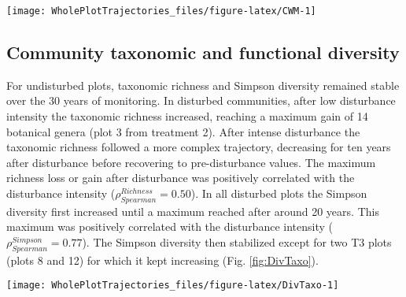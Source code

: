 \documentclass[fleqn,10pt]{ArtEcoFoG} %
\begin{document}
\begin{figure*}

{\centering \texttt{[image: WholePlotTrajectories\_files/figure-latex/CWM-1]} 

}

\caption{Trajectories of community weighted means over 30 years after disturbance of four leaf traits (Leaf thickness, chlorophyll content, toughness, and specific area), two stem traits (wood specific gravity, and bark thickness) and one life history trait (Specific maximum height at adult stage). }\label{fig:CWM}
\end{figure*}

\subsection{Community taxonomic and functional
diversity}\label{community-taxonomic-and-functional-diversity}

For undisturbed plots, taxonomic richness and Simpson diversity remained
stable over the 30 years of monitoring. In disturbed communities, after
low disturbance intensity the taxonomic richness increased, reaching a
maximum gain of 14 botanical genera (plot 3 from treatment 2). After
intense disturbance the taxonomic richness followed a more complex
trajectory, decreasing for ten years after disturbance before recovering
to pre-disturbance values. The maximum richness loss or gain after
disturbance was positively correlated with the disturbance intensity
(\(\rho_{Spearman}^{Richness}=0.50\)). In all disturbed plots the
Simpson diversity first increased until a maximum reached after around
20 years. This maximum was positively correlated with the disturbance
intensity (\(\rho_{Spearman}^{Simpson}=0.77\)). The Simpson diversity
then stabilized except for two T3 plots (plots 8 and 12) for which it
kept increasing (Fig. \ref{fig:DivTaxo}).

\begin{figure*}

{\centering \texttt{[image: WholePlotTrajectories\_files/figure-latex/DivTaxo-1]} 

}

\caption{Trajectories over 30 years of the difference with the 1989 inventory (2 years after disturbance) of community taxonomic richness \textbf{(a)}, Simpson diversity \textbf{(b)}, functional richness \textbf{(c)}, and Rao diversity \textbf{(d)}. Shaded areas are the credibility intervals }\label{fig:DivTaxo}
\end{figure*}
\end{document}
